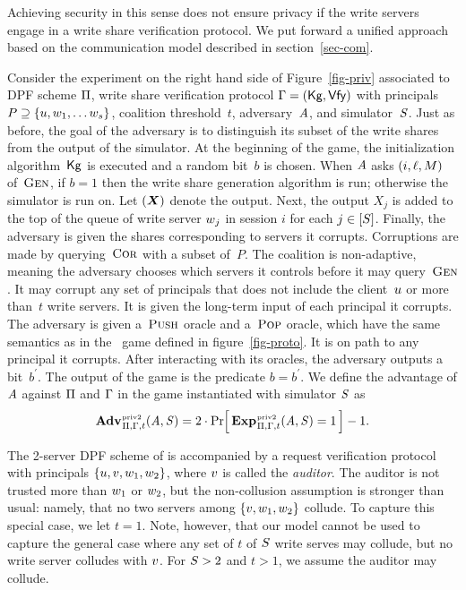 Achieving security in this sense does not ensure privacy if the write servers
engage in a write share verification protocol.  We put forward a unified
approach based on the communication model described in section~\ref{sec-com}.

Consider the experiment on the right hand side of Figure~\ref{fig-priv}
associated to DPF scheme $\mathrm{\Pi}$, write share verification protocol $\mathrm{\Gamma} =
(\mathsf{Kg}, \mathsf{Vfy})$ with principals $P \supseteq \{u, w_1, \ldots
w_s\}$, coalition threshold~$t$, adversary~$\mathit{A}$, and simulator~$\mathit{S}$.
%
Just as before, the goal of the adversary is to distinguish its subset of the
write shares from the output of the simulator.
%
At the beginning of the game,
the initialization algorithm~$\mathsf{Kg}$ is executed and a random bit~$b$ is chosen.
%
When $\mathit{A}$ asks $(i, \ell, M)$ of~$\textsc{Gen}$, if $b=1$ then the write share
generation algorithm is run; otherwise the simulator is run on. Let $(\shares)$
denote the output. Next, the output $X_j$ is added to the top of the queue of
write server $w_j$ in session $i$ for each $j\in[S]$. Finally, the
adversary is given the shares corresponding to servers it corrupts.
%
Corruptions are made by querying~$\textsc{Cor}$ with a subset of~$P$. The coalition is
non-adaptive, meaning the adversary chooses which servers it controls before it may
query~$\textsc{Gen}$. It may corrupt any set of principals that does not include the
client~$u$ or more than~$t$ write servers. It is given the long-term input
of each principal it corrupts.
%
The adversary is given a~$\textsc{Push}$ oracle and a~$\textsc{Pop}$ oracle, which have the
same semantics as in the \protosec~game defined in figure~\ref{fig-proto}. It is
on path to any principal it corrupts.
%
After interacting with its oracles, the adversary outputs a bit~$b^\prime$. The
output of the game is the predicate $b=b^\prime$. We define the advantage of
$\mathit{A}$ against $\mathrm{\Pi}$ and $\mathrm{\Gamma}$ in the game instantiated with simulator
$\mathit{S}$ as
\[
  \adv{\privtwo}_{\dpf,\reqvfy,t}(\advA,\advS) =
  2 \cdot \Prob{\game{\privtwo}_{\dpf,\reqvfy,t}(\advA,\advS) \outputs \true} - 1.
\]

The 2-server DPF scheme of \cite{riposte} is accompanied by a request
verification protocol with principals $\{u, v, w_1,
w_2\}$, where $v$ is called the \emph{auditor}. The auditor is not
trusted more than $w_1$ or $w_2$, but the non-collusion assumption
is stronger than usual: namely, that no two servers among $\{v, w_1,
w_2\}$ collude. To capture this special case, we let $t=1$. Note,
however, that our model cannot be used to capture the general case where any set
of $t$ of $S$ write serves may collude, but no write server colludes with
$v$. For $S>2$ and $t>1$, we assume the auditor may collude.
